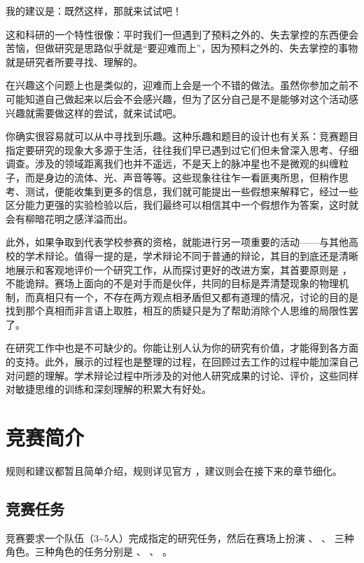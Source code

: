 \documentclass[a4paper,10pt,english]{sphinxmanual}
\begin{document}
我的建议是：既然这样，那就来试试吧！

这和科研的一个特性很像：平时我们一但遇到了预料之外的、失去掌控的东西便会苦恼，但做研究是思路似乎就是“要迎难而上”，因为预料之外的、失去掌控的事物就是研究者所要寻找、理解的。

在兴趣这个问题上也是类似的，迎难而上会是一个不错的做法。虽然你参加之前不可能知道自己做起来以后会不会感兴趣，但为了区分自己是不是能够对这个活动感兴趣就需要做这样的尝试，就来试试吧。

你确实很容易就可以从中寻找到乐趣。这种乐趣和题目的设计也有关系：竞赛题目指定要研究的现象大多源于生活，往往我们早已遇到过它们但未曾深入思考、仔细调查。涉及的领域距离我们也并不遥远，不是天上的脉冲星也不是微观的纠缠粒子，而是身边的流体、光、声音等等。这些现象往往乍一看匪夷所思，但稍作思考、测试，便能收集到更多的信息，我们就可能提出一些假想来解释它，经过一些区分能力更强的实验检验以后，我们最终可以相信其中一个假想作为答案，这时就会有柳暗花明之感洋溢而出。

此外，如果争取到代表学校参赛的资格，就能进行另一项重要的活动——与其他高校的学术辩论。值得一提的是，学术辩论不同于普通的辩论，其目的到底还是清晰地展示和客观地评价一个研究工作，从而探讨更好的改进方案，其首要原则是  ，不能诡辩。赛场上面向的不是对手而是伙伴，共同的目标是弄清楚现象的物理机制，而真相只有一个，不存在两方观点相矛盾但又都有道理的情况，讨论的目的是找到那个真相而非言语上取胜，相互的质疑只是为了帮助消除个人思维的局限性罢了。

 在研究工作中也是不可缺少的。你能让别人认为你的研究有价值，才能得到各方面的支持。此外，展示的过程也是整理的过程，在回顾过去工作的过程中能加深自己对问题的理解。学术辩论过程中所涉及的对他人研究成果的讨论、评价，这些同样对敏捷思维的训练和深刻理解的积累大有好处。


\chapter{竞赛简介}
\label{\detokenize{2. Intro_Tournament:id1}}\label{\detokenize{2. Intro_Tournament::doc}}
规则和建议都暂且简单介绍，规则详见官方  ，建议则会在接下来的章节细化。


\section{竞赛任务}
\label{\detokenize{2. Intro_Tournament:id2}}
竞赛要求一个队伍（3\textasciitilde{}5人）完成指定的研究任务，然后在赛场上扮演  、  、  三种角色。三种角色的任务分别是  、  、  。
\end{document}
